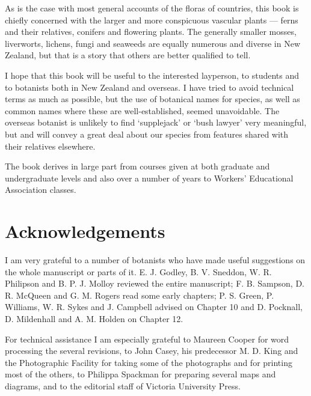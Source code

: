 As is the case with most general accounts of the floras of countries, this book is chiefly concerned with the larger and more conspicuous vascular plants — ferns and their relatives, conifers and flowering plants. The generally smaller mosses, liverworts, lichens, fungi and seaweeds are equally numerous and diverse in New Zealand, but that is a story that others are better qualified to tell.

I hope that this book will be useful to the interested layperson, to students and to botanists both in New Zealand and overseas. I have tried to avoid technical terms as much as possible, but the use of botanical names for species, as well as common names where these are well-established, seemed unavoidable. The overseas botanist is unlikely to find `supplejack' or `bush lawyer' very meaningful, but  and  will convey a great deal about our species from features shared with their relatives elsewhere.

The book derives in large part from courses given at both graduate and undergraduate levels and also over a number of years to Workers' Educational Association classes.

\chapter*{Acknowledgements}

I am very grateful to a number of botanists who have made useful suggestions on the whole manuscript or parts of it. E. J. Godley, B. V. Sneddon, W. R. Philipson and B. P. J. Molloy reviewed the entire manuscript; F. B. Sampson, D. R. McQueen and G. M. Rogers read some early chapters; P. S. Green, P. Williams, W. R. Sykes and J. Campbell advised on Chapter 10 and D. Pocknall, D. Mildenhall and A. M. Holden on Chapter 12.\par
For technical assistance I am especially grateful to Maureen Cooper for word processing the several revisions, to John Casey, his predecessor M. D. King and the Photographic Facility for taking some of the photographs and for printing most of the others, to Philippa Spackman for preparing several maps and diagrams, and to the editorial staff of Victoria University Press.
